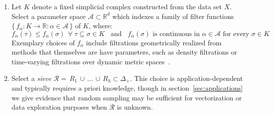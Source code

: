 \documentclass[10pt]{article}
\newenvironment{boxedenumerate}
  {\begin{mdframed}[font=\small, linewidth=1pt]}
  {\end{mdframed}}
\numberwithin{equation}{section}
\newcommand{\+}{%
	\raisebox{0.18ex}{\scaleobj{0.55}{+}}
}
\theoremstyle{definition}
\theoremstyle{definition}
\begin{document}
\begin{boxedenumerate}
\begin{enumerate}
	\item Let $K$ denote a fixed simplicial complex constructed from the data set $X$. Select a parameter space $\mathcal{A} \subset \mathbb{R}^d$ which indexes a family of filter functions $\{\, f_\alpha : K \to \mathbb{R} :  \alpha \in \mathcal{A} \, \}$ of $K$, where:
	\begin{equation}
		f_\alpha(\tau) \leq f_\alpha(\sigma) \;\, \forall \; \tau \subseteq \sigma \in K  \;\; \text{ and } \; \; f_\alpha(\sigma) \text{ is continuous in } \alpha \in \mathcal{A} \text{ for every } \sigma \in K
	\end{equation}
	Exemplary choices of $f_\alpha$ include filtrations geometrically realized from methods that themselves are have parameters, such as density filtrations or time-varying filtrations over dynamic metric spaces~\cite{kim2021spatiotemporal}. %
	\item Select a \emph{sieve} $\mathcal{R} = \, R_1 \, \cup \, \dots \, \cup \, R_h \subset \Delta_+$. %
	This choice is application-dependent and typically requires a priori knowledge, though in section~\ref{sec:applications} we give evidence that random sampling may be sufficient for vectorization or data exploration purposes when $\mathcal{R}$ is unknown.
	

\end{enumerate}
\end{boxedenumerate}
\end{document}
